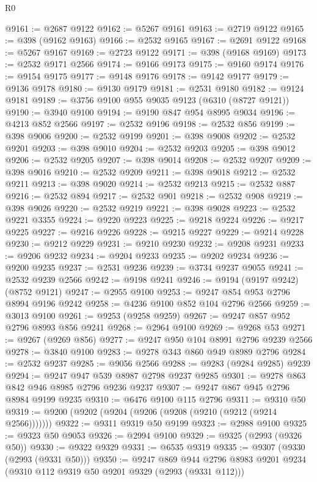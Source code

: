 \begin{lexlean}{R0}
\begin{coremodule}
@9161 := @2687 @9122
@9162 := @5267 @9161
@9163 := @2719 @9122
@9165 := @398 (@9162 @9163)
@9166 := @2532 @9165
@9167 := @2691 @9122
@9168 := @5267 @9167
@9169 := @2723 @9122
@9171 := @398 (@9168 @9169)
@9173 := @2532 @9171 @2566
@9174 := @9166 @9173
@9175 := @9160 @9174
@9176 := @9154 @9175
@9177 := @9148 @9176
@9178 := @9142 @9177
@9179 := @9136 @9178
@9180 := @9130 @9179
@9181 := @2531 @9180
@9182 := @9124 @9181
@9189 := @3756 @9100 @955 @9035 @9123 (@6310 (@8727 @9121))
@9190 := @3940 @9100
@9194 := @9190 @847 @954 @8995 @9034
@9196 := @4213 @852 @2566
@9197 := @2532 @9196
@9198 := @2532 @856
@9199 := @398 @9006
@9200 := @2532 @9199
@9201 := @398 @9008
@9202 := @2532 @9201
@9203 := @398 @9010
@9204 := @2532 @9203
@9205 := @398 @9012
@9206 := @2532 @9205
@9207 := @398 @9014
@9208 := @2532 @9207
@9209 := @398 @9016
@9210 := @2532 @9209
@9211 := @398 @9018
@9212 := @2532 @9211
@9213 := @398 @9020
@9214 := @2532 @9213
@9215 := @2532 @887
@9216 := @2532 @894
@9217 := @2532 @901
@9218 := @2532 @908
@9219 := @398 @9026
@9220 := @2532 @9219
@9221 := @398 @9028
@9223 := @2532 @9221 @3355
@9224 := @9220 @9223
@9225 := @9218 @9224
@9226 := @9217 @9225
@9227 := @9216 @9226
@9228 := @9215 @9227
@9229 := @9214 @9228
@9230 := @9212 @9229
@9231 := @9210 @9230
@9232 := @9208 @9231
@9233 := @9206 @9232
@9234 := @9204 @9233
@9235 := @9202 @9234
@9236 := @9200 @9235
@9237 := @2531 @9236
@9239 := @3734 @9237 @9055
@9241 := @2532 @9239 @2566
@9242 := @9198 @9241
@9246 := @9194 (@9197 @9242) (@8752 @9121)
@9247 := @2955 @9100
@9253 := @9247 @854 @953 @2796 @8994 @9196 @9242
@9258 := @4236 @9100 @852 @104 @2796 @2566
@9259 := @3013 @9100
@9261 := @9253 (@9258 @9259)
@9267 := @9247 @857 @952 @2796 @8993 @856 @9241
@9268 := @2964 @9100
@9269 := @9268 @53
@9271 := @9267 (@9269 @856)
@9277 := @9247 @950 @104 @8991 @2796 @9239 @2566
@9278 := @3840 @9100
@9283 := @9278 @343 @860 @949 @8989 @2796
@9284 := @2532 @9237
@9285 := @9056 @2566
@9288 := @9283 (@9284 @9285) @9239
@9294 := @9247 @947 @539 @8987 @2798 @9237 @9285
@9301 := @9278 @863 @842 @946 @8985 @2796 @9236 @9237
@9307 := @9247 @867 @945 @2796 @8984 @9199 @9235
@9310 := @6476 @9100 @115 @2796
@9311 := @9310 @50
@9319 := @9200 (@9202 (@9204 (@9206 (@9208 (@9210 (@9212 (@9214 @2566)))))))
@9322 := @9311 @9319 @50 @9199
@9323 := @2988 @9100
@9325 := @9323 @50 @9053
@9326 := @2994 @9100
@9329 := @9325 (@2993 (@9326 @50))
@9330 := @9322 @9329
@9331 := @6535 @9319
@9335 := @9307 (@9330 (@2993 (@9331 @50)))
@9350 := @9247
    @869
    @944
    @2796
    @8983
    @9201
    @9234
    (@9310 @112 @9319 @50 @9201 @9329 (@2993 (@9331 @112)))

\end{coremodule}
\end{lexlean}
